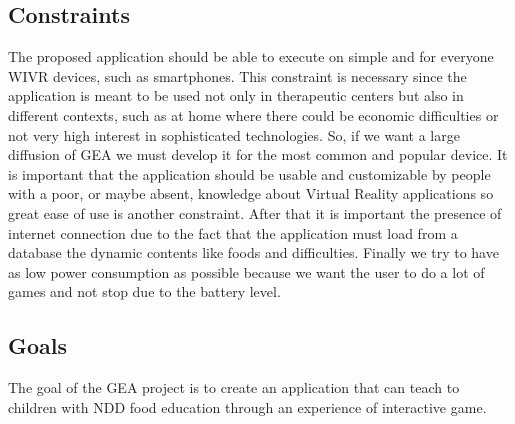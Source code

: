 \subsection{Constraints}
The proposed application should be able to execute on simple and for everyone WIVR devices, such as smartphones. This constraint is necessary since the application is meant to be used not only in therapeutic centers but also in different contexts, such as at home where there could be economic difficulties or not very high interest in sophisticated technologies. So, if we want a large diffusion of GEA we must develop it for the most common and popular device. It is important that the application should be usable and customizable by people with a poor, or maybe absent, knowledge about Virtual Reality applications so great ease of use is another constraint. After that it is important the presence of internet connection due to the fact that the application must load from a database the dynamic contents like foods and difficulties. Finally we try to have as low power consumption as possible because we want the user to do a lot of games and not stop due to the battery level.
\subsection{Goals}
The goal of the GEA project is to create an application that can teach to children with NDD food education through an experience of interactive game.
